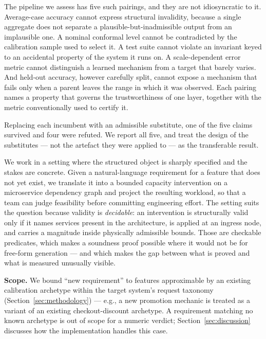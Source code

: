 \documentclass[journal, 10pt]{IEEEtran}
\begin{document}
The pipeline we assess has five such pairings, and they are not idiosyncratic to
it. Average-case accuracy cannot express structural invalidity, because a single
aggregate does not separate a plausible-but-inadmissible output from an
implausible one. A nominal conformal level cannot be contradicted by the
calibration sample used to select it. A test suite cannot violate an invariant
keyed to an accidental property of the system it runs on. A scale-dependent error
metric cannot distinguish a learned mechanism from a target that barely varies.
And held-out accuracy, however carefully split, cannot expose a mechanism that
fails only when a parent leaves the range in which it was observed. Each pairing
names a property that governs the trustworthiness of one layer, together with the
metric conventionally used to certify it.

Replacing each incumbent with an admissible substitute, one of the five claims
survived and four were refuted. We report all five, and treat the design of the
substitutes --- not the artefact they were applied to --- as the transferable
result.

We work in a setting where the structured object is sharply specified and the
stakes are concrete. Given a natural-language requirement for a feature that does
not yet exist, we translate it into a bounded capacity intervention on a
microservice dependency graph and project the resulting workload, so that a team
can judge feasibility before committing engineering effort. The setting suits the
question because validity is \emph{decidable}: an intervention is structurally
valid only if it names services present in the architecture, is applied at an
ingress node, and carries a magnitude inside physically admissible bounds. Those
are checkable predicates, which makes a soundness proof possible where it would
not be for free-form generation --- and which makes the gap between what is
proved and what is measured unusually visible.

\textbf{Scope.} We bound ``new requirement'' to features approximable by an existing calibration archetype within the target system's request taxonomy (Section~\ref{sec:methodology}) --- e.g., a new promotion mechanic is treated as a variant of an existing checkout-discount archetype. A requirement matching no known archetype is out of scope for a numeric verdict; Section~\ref{sec:discussion} discusses how the implementation handles this case.
\end{document}
